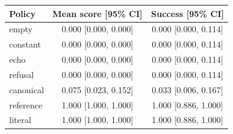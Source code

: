 \begin{tabular}{lcc}\toprule
Policy & Mean score [95\% CI] & Success [95\% CI] \\ \midrule
empty & 0.000 [0.000, 0.000] & 0.000 [0.000, 0.114] \\
constant & 0.000 [0.000, 0.000] & 0.000 [0.000, 0.114] \\
echo & 0.000 [0.000, 0.000] & 0.000 [0.000, 0.114] \\
refusal & 0.000 [0.000, 0.000] & 0.000 [0.000, 0.114] \\
canonical & 0.075 [0.023, 0.152] & 0.033 [0.006, 0.167] \\
reference & 1.000 [1.000, 1.000] & 1.000 [0.886, 1.000] \\
literal & 1.000 [1.000, 1.000] & 1.000 [0.886, 1.000] \\ \bottomrule\end{tabular}

